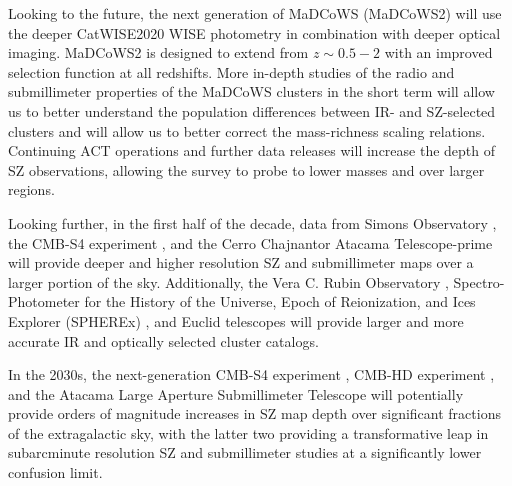 \documentclass[longauth]{aa} %
\begin{document}
Looking to the future, the next generation of MaDCoWS (MaDCoWS2) will  use the deeper CatWISE2020 \citep{Eisenhardt2020} WISE photometry in combination with deeper optical imaging. MaDCoWS2 is designed to extend from $z\sim0.5-2$ with an improved selection function at all redshifts. More in-depth studies of the radio and submillimeter properties of the MaDCoWS clusters in the short term will allow us to better understand the population differences between IR- and SZ-selected clusters and will allow us to better correct the mass-richness scaling relations.   Continuing ACT operations and further data releases will increase the depth of SZ observations, allowing the survey to probe to lower masses and over larger regions. 

Looking further, in the first half of the decade, data from Simons Observatory \citep[SO;][]{zhu2021, thesimonsobservatorycollaboration2019simons,Ade2019}, the CMB-S4 experiment \citep{abitbol2017cmbs4, Abazajian2016, Abazajian2019}, and the Cerro Chajnantor Atacama Telescope-prime \citep[CCAT-prime;][]{ Vavagiakis2018, aravena2019ccatprime, Choi2020} will provide deeper and higher resolution SZ and submillimeter maps over a larger portion of the sky. Additionally, the Vera C. Rubin Observatory \citep{Ivezi2019}, Spectro-Photometer for the History of the Universe, Epoch of Reionization, and Ices Explorer (SPHEREx) \citep{Bock2018, Cooray2018, Crill2020}, and Euclid telescopes \citep{Euclid2019} will provide larger and more accurate IR and optically selected cluster catalogs. 

In the 2030s, the next-generation CMB-S4 experiment \citep{Abazajian2016, abitbol2017cmbs4}, CMB-HD experiment \citep{Sehgal2019,Sehgal2020}, and the Atacama Large Aperture Submillimeter Telescope \citep[AtLAST;][]{Klaassen2020} will potentially provide orders of magnitude increases in SZ map depth over significant fractions of the extragalactic sky, with the latter two providing a transformative leap in subarcminute resolution SZ and submillimeter studies at a significantly lower confusion limit. 

\end{document}
